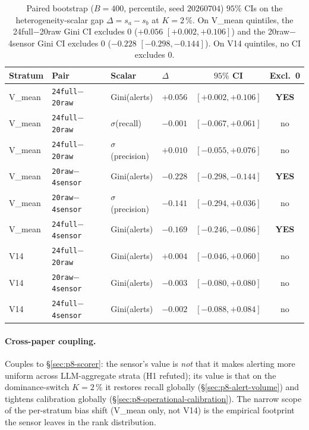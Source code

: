 \documentclass{article}
\begin{document}
\begin{table}[t]
\centering
\small
\caption{Paired bootstrap ($B{=}400$, percentile, seed $20260704$)
$95\%$ CIs on the heterogeneity-scalar gap $\Delta = s_a - s_b$ at
$K{=}2\,\%$. On V\_mean quintiles, the 24full$-$20raw Gini CI excludes 0
($+0.056$ $[+0.002, +0.106]$) and the 20raw$-$4sensor Gini CI excludes 0
($-0.228$ $[-0.298, -0.144]$). On V14 quintiles, no CI excludes 0.}
\label{tab:p8-subgroup-fairness-boot}
\begin{tabular}{llllcc}
\toprule
Stratum & Pair & Scalar & $\Delta$ & $95\%$ CI & Excl.\ 0 \\
\midrule
V\_mean & \texttt{24full}$-$\texttt{20raw}    & Gini(alerts)        & $+0.056$  & $[+0.002, +0.106]$   & \textbf{YES} \\
V\_mean & \texttt{24full}$-$\texttt{20raw}    & $\sigma$(recall)    & $-0.001$  & $[-0.067, +0.061]$   & no \\
V\_mean & \texttt{24full}$-$\texttt{20raw}    & $\sigma$(precision) & $+0.010$  & $[-0.055, +0.076]$   & no \\
V\_mean & \texttt{20raw}$-$\texttt{4sensor}   & Gini(alerts)        & $-0.228$  & $[-0.298, -0.144]$   & \textbf{YES} \\
V\_mean & \texttt{20raw}$-$\texttt{4sensor}   & $\sigma$(precision) & $-0.141$  & $[-0.294, +0.036]$   & no \\
V\_mean & \texttt{24full}$-$\texttt{4sensor}  & Gini(alerts)        & $-0.169$  & $[-0.246, -0.086]$   & \textbf{YES} \\
V14     & \texttt{24full}$-$\texttt{20raw}    & Gini(alerts)        & $+0.004$  & $[-0.046, +0.060]$   & no \\
V14     & \texttt{20raw}$-$\texttt{4sensor}   & Gini(alerts)        & $-0.003$  & $[-0.080, +0.080]$   & no \\
V14     & \texttt{24full}$-$\texttt{4sensor}  & Gini(alerts)        & $-0.002$  & $[-0.088, +0.084]$   & no \\
\bottomrule
\end{tabular}
\end{table}

\paragraph{Cross-paper coupling.}
Couples to \S\ref{sec:p8-scorer}: the sensor's value is \emph{not}
that it makes alerting more uniform across LLM-aggregate strata (H1
refuted); its value is that on the dominance-switch $K{=}2\,\%$ it
restores recall globally (\S\ref{sec:p8-alert-volume}) and tightens
calibration globally (\S\ref{sec:p8-operational-calibration}). The
narrow scope of the per-stratum bias shift (V\_mean only, not V14) is
the empirical footprint the sensor leaves in the rank distribution.
\end{document}
